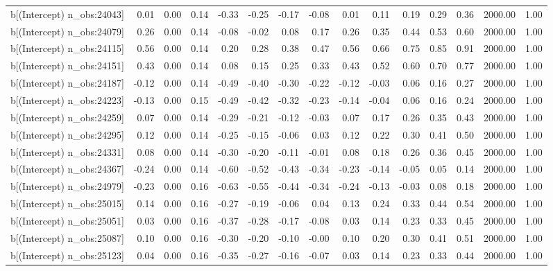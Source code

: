 \begin{table}[ht]
\begin{tabular}{rrrrrrrrrrrrrrr}
  b[(Intercept) n\_obs:24043] & 0.01 & 0.00 & 0.14 & -0.33 & -0.25 & -0.17 & -0.08 & 0.01 & 0.11 & 0.19 & 0.29 & 0.36 & 2000.00 & 1.00 \\ 
  b[(Intercept) n\_obs:24079] & 0.26 & 0.00 & 0.14 & -0.08 & -0.02 & 0.08 & 0.17 & 0.26 & 0.35 & 0.44 & 0.53 & 0.60 & 2000.00 & 1.00 \\ 
  b[(Intercept) n\_obs:24115] & 0.56 & 0.00 & 0.14 & 0.20 & 0.28 & 0.38 & 0.47 & 0.56 & 0.66 & 0.75 & 0.85 & 0.91 & 2000.00 & 1.00 \\ 
  b[(Intercept) n\_obs:24151] & 0.43 & 0.00 & 0.14 & 0.08 & 0.15 & 0.25 & 0.33 & 0.43 & 0.52 & 0.60 & 0.70 & 0.77 & 2000.00 & 1.00 \\ 
  b[(Intercept) n\_obs:24187] & -0.12 & 0.00 & 0.14 & -0.49 & -0.40 & -0.30 & -0.22 & -0.12 & -0.03 & 0.06 & 0.16 & 0.27 & 2000.00 & 1.00 \\ 
  b[(Intercept) n\_obs:24223] & -0.13 & 0.00 & 0.15 & -0.49 & -0.42 & -0.32 & -0.23 & -0.14 & -0.04 & 0.06 & 0.16 & 0.24 & 2000.00 & 1.00 \\ 
  b[(Intercept) n\_obs:24259] & 0.07 & 0.00 & 0.14 & -0.29 & -0.21 & -0.12 & -0.03 & 0.07 & 0.17 & 0.26 & 0.35 & 0.43 & 2000.00 & 1.00 \\ 
  b[(Intercept) n\_obs:24295] & 0.12 & 0.00 & 0.14 & -0.25 & -0.15 & -0.06 & 0.03 & 0.12 & 0.22 & 0.30 & 0.41 & 0.50 & 2000.00 & 1.00 \\ 
  b[(Intercept) n\_obs:24331] & 0.08 & 0.00 & 0.14 & -0.30 & -0.20 & -0.11 & -0.01 & 0.08 & 0.18 & 0.26 & 0.36 & 0.45 & 2000.00 & 1.00 \\ 
  b[(Intercept) n\_obs:24367] & -0.24 & 0.00 & 0.14 & -0.60 & -0.52 & -0.43 & -0.34 & -0.23 & -0.14 & -0.05 & 0.05 & 0.14 & 2000.00 & 1.00 \\ 
  b[(Intercept) n\_obs:24979] & -0.23 & 0.00 & 0.16 & -0.63 & -0.55 & -0.44 & -0.34 & -0.24 & -0.13 & -0.03 & 0.08 & 0.18 & 2000.00 & 1.00 \\ 
  b[(Intercept) n\_obs:25015] & 0.14 & 0.00 & 0.16 & -0.27 & -0.19 & -0.06 & 0.04 & 0.13 & 0.24 & 0.33 & 0.44 & 0.54 & 2000.00 & 1.00 \\ 
  b[(Intercept) n\_obs:25051] & 0.03 & 0.00 & 0.16 & -0.37 & -0.28 & -0.17 & -0.08 & 0.03 & 0.14 & 0.23 & 0.33 & 0.45 & 2000.00 & 1.00 \\ 
  b[(Intercept) n\_obs:25087] & 0.10 & 0.00 & 0.16 & -0.30 & -0.20 & -0.10 & -0.00 & 0.10 & 0.20 & 0.30 & 0.41 & 0.51 & 2000.00 & 1.00 \\ 
  b[(Intercept) n\_obs:25123] & 0.04 & 0.00 & 0.16 & -0.35 & -0.27 & -0.16 & -0.07 & 0.03 & 0.14 & 0.23 & 0.33 & 0.44 & 2000.00 & 1.00 \\ 

\end{tabular}
\end{table}
